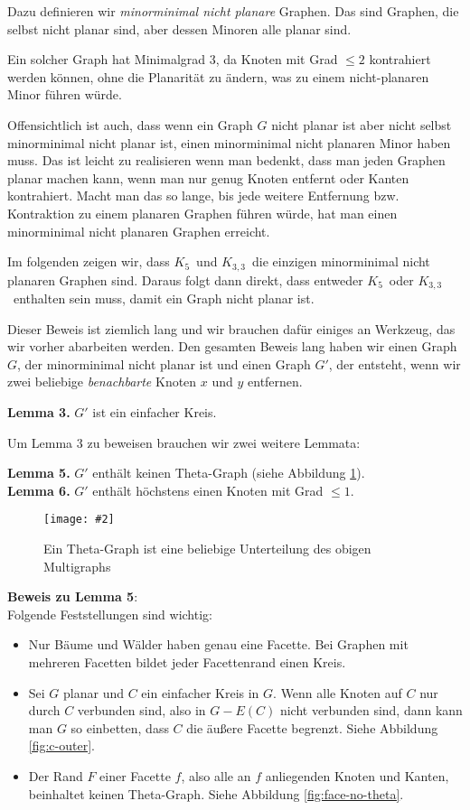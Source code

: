 \documentclass[10pt,a4paper]{article}
\makeatletter
\def\maxwidth#1{\ifdim\Gin@nat@width>#1 #1\else\Gin@nat@width\fi}
\newcommand{\imageFigure}[4]{%
    \begin{figure}[h]%
        \centering%
        {%
            \setlength{\fboxsep}{1pt}%
            \setlength{\fboxrule}{1pt}%
            \texttt{[image: \#2]}%
        }%
        \caption{#1}%
        \label{fig:#4}%
    \end{figure}%
}
\newcommand{\Kf}{$K_5$}
\newcommand{\Kdd}{$K_{3,3}$}
\makeatother
\begin{document}
Dazu definieren wir \textit{minorminimal nicht planare} Graphen.
Das sind Graphen, die selbst nicht planar sind, aber dessen Minoren alle planar
sind.

Ein solcher Graph hat Minimalgrad 3, da Knoten mit Grad $\leq 2$ kontrahiert
werden können, ohne die Planarität zu ändern, was zu einem nicht-planaren Minor
führen würde.

Offensichtlich ist auch, dass wenn ein Graph $G$ nicht planar ist aber nicht
selbst minorminimal nicht planar ist, einen minorminimal nicht planaren Minor
haben muss.
Das ist leicht zu realisieren wenn man bedenkt, dass man jeden Graphen planar
machen kann, wenn man nur genug Knoten entfernt oder Kanten kontrahiert.
Macht man das so lange, bis jede weitere Entfernung bzw. Kontraktion zu einem
planaren Graphen führen würde, hat man einen minorminimal nicht planaren
Graphen erreicht.

Im folgenden zeigen wir, dass \Kf~und \Kdd~die einzigen minorminimal nicht
planaren Graphen sind.
Daraus folgt dann direkt, dass entweder \Kf~oder \Kdd~enthalten sein muss,
damit ein Graph nicht planar ist.

Dieser Beweis ist ziemlich lang und wir brauchen dafür einiges an Werkzeug, das
wir vorher abarbeiten werden.
Den gesamten Beweis lang haben wir einen Graph $G$, der minorminimal nicht
planar ist und einen Graph $G'$, der entsteht, wenn wir zwei beliebige
\textit{benachbarte} Knoten $x$ und $y$ entfernen.

\textbf{Lemma 3.} $G'$ ist ein einfacher Kreis.

Um Lemma 3 zu beweisen brauchen wir zwei weitere Lemmata:

\textbf{Lemma 5.} $G'$ enthält keinen Theta-Graph (siehe Abbildung
\ref{fig:theta}).\\
\textbf{Lemma 6.} $G'$ enthält höchstens einen Knoten mit Grad $\leq 1$.

\imageFigure{Ein Theta-Graph ist eine beliebige Unterteilung des obigen
Multigraphs}{theta.png}{.3}{theta}

\textbf{Beweis zu Lemma 5}:\\
Folgende Feststellungen sind wichtig:
\begin{itemize}
    \item Nur Bäume und Wälder haben genau eine Facette.
        Bei Graphen mit mehreren Facetten bildet jeder Facettenrand einen
        Kreis.
    \item Sei $G$ planar und $C$ ein einfacher Kreis in $G$.
        Wenn alle Knoten auf $C$ nur durch $C$ verbunden sind, also in $G-E(C)$
        nicht verbunden sind, dann kann man $G$ so einbetten, dass $C$ die
        äußere Facette begrenzt. Siehe Abbildung \ref{fig:c-outer}.
    \item Der Rand $F$ einer Facette $f$, also alle an $f$ anliegenden Knoten
        und Kanten, beinhaltet keinen Theta-Graph. Siehe Abbildung
        \ref{fig:face-no-theta}.
\end{itemize}
\end{document}
